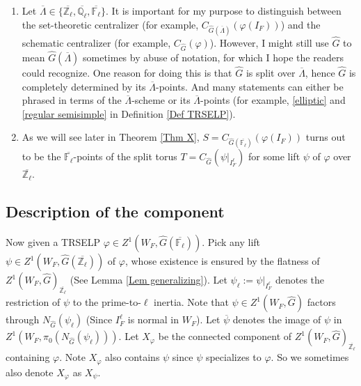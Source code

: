   \begin{remark}
  	\begin{enumerate}
  		\item Let $\overline{\Lambda} \in \{\overline{\mathbb{Z}_{\ell}}, \overline{\mathbb{Q}_{\ell}}, \overline{\mathbb{F}_{\ell}}\}$. It is important for my purpose to distinguish between the set-theoretic centralizer (for example, $C_{\hat{G}(\overline{\Lambda})}(\varphi(I_F))$) and the schematic centralizer (for example, $C_{\hat{G}}(\varphi)$). However, I might still use $\hat{G}$ to mean $\hat{G}(\overline{\Lambda})$ sometimes by abuse of notation, for which I hope the readers could recognize. One reason for doing this is that $\hat{G}$ is split over $\overline{\Lambda}$, hence $\hat{G}$ is completely determined by its $\overline{\Lambda}$-points. And many statements can either be phrased in terms of the $\overline{\Lambda}$-scheme or its $\overline{\Lambda}$-points (for example, \ref{elliptic} and \ref{regular semisimple} in Definition \ref{Def TRSELP}).
  		\item As we will see later in Theorem \ref{Thm X}, $S=C_{\hat{G}(\overline{\mathbb{F}_{\ell}})}(\varphi(I_F))$ turns out to be the $\overline{\mathbb{F}_{\ell}}$-points of the split torus $T=C_{\hat{G}}(\psi|_{I_F^{\ell}})$ for some lift $\psi$ of $\varphi$ over $\overline{\mathbb{Z}_{\ell}}$.
  	\end{enumerate}
  \end{remark}

\subsection{Description of the component}\label{Subsection the component}

Now given a TRSELP $\varphi \in Z^1(W_F, \hat{G}(\overline{\mathbb{F}_{\ell}}))$. Pick any lift $\psi \in Z^1(W_F, \hat{G}(\overline{\mathbb{Z}_{\ell}}))$ of $\varphi$, whose existence is ensured by the flatness of $Z^1(W_F, \hat{G})_{\overline{\mathbb{Z}_{\ell}}}$ (See Lemma \ref{Lem generalizing}). Let $\psi_{\ell}:=\psi|_{I_F^{\ell}}$ denotes the restriction of $\psi$ to the prime-to-$\ell$ inertia. Note that $\psi \in Z^1(W_F, \hat{G})$ factors through $N_{\hat{G}}(\psi_{\ell})$ (Since $I_F^{\ell}$ is normal in $W_F$). Let $\overline{\psi}$ denotes the image of $\psi$ in $Z^1(W_F, \pi_0(N_{\hat{G}}(\psi_{\ell})))$. Let $X_{\varphi}$ be the connected component of $Z^1(W_F, \hat{G})_{\overline{\mathbb{Z}_{\ell}}}$ containing $\varphi$. Note $X_{\varphi}$ also contains $\psi$ since $\psi$ specializes to $\varphi$. So we sometimes also denote $X_{\varphi}$ as $X_{\psi}$.


